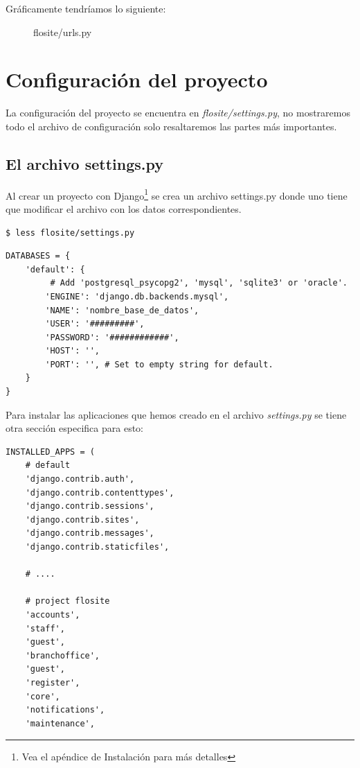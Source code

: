 Gráficamente tendríamos lo siguiente:

\begin{figure}[h]
  \begin{center}
    \def\svgwidth{\columnwidth}
    
    \caption[Django Urls]{flosite/urls.py}
  \end{center}
\end{figure}

\section{Configuración del proyecto}
La configuración del proyecto se encuentra en {\it flosite/settings.py}, no
mostraremos todo el archivo de configuración solo resaltaremos las partes más
importantes.

\subsection{El archivo settings.py}
Al crear un proyecto con Django\footnote{Vea el apéndice de Instalación para
más detalles} se crea un archivo settings.py donde uno tiene que modificar el
archivo con los datos correspondientes.

\begin{verbatim}
$ less flosite/settings.py
\end{verbatim}

\begin{verbatim}
DATABASES = {
    'default': {
         # Add 'postgresql_psycopg2', 'mysql', 'sqlite3' or 'oracle'.
        'ENGINE': 'django.db.backends.mysql',
        'NAME': 'nombre_base_de_datos',
        'USER': '#########',
        'PASSWORD': '############',
        'HOST': '',
        'PORT': '', # Set to empty string for default.
    }
}
\end{verbatim}

Para instalar las aplicaciones que hemos creado en el archivo {\it settings.py}
se tiene otra sección especifica para esto:

\begin{verbatim}
INSTALLED_APPS = (
    # default
    'django.contrib.auth',
    'django.contrib.contenttypes',
    'django.contrib.sessions',
    'django.contrib.sites',
    'django.contrib.messages',
    'django.contrib.staticfiles',

    # ....

    # project flosite
    'accounts',
    'staff',
    'guest',
    'branchoffice',
    'guest',
    'register',
    'core',
    'notifications',
    'maintenance',
\end{verbatim}

